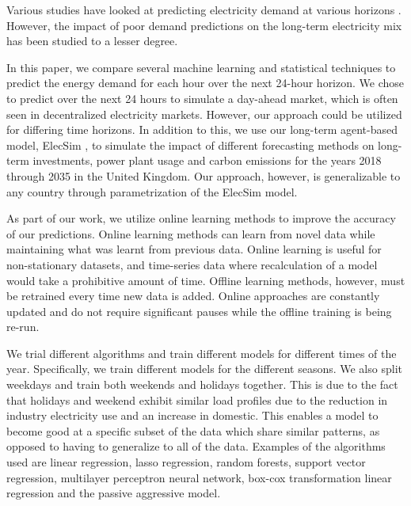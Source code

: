 


Various studies have looked at predicting electricity demand at various horizons \cite{Singh2012,Huang2003,Andersen2013}. However, the impact of poor demand predictions on the long-term electricity mix has been studied to a lesser degree.

In this paper, we compare several machine learning and statistical techniques to predict the energy demand for each hour over the next 24-hour horizon. We chose to predict over the next 24 hours to simulate a day-ahead market, which is often seen in decentralized electricity markets. However, our approach could be utilized for differing time horizons. In addition to this, we use our long-term agent-based model, ElecSim \cite{Kell, Kell2020}, to simulate the impact of different forecasting methods on long-term investments, power plant usage and carbon emissions for the years 2018 through 2035 in the United Kingdom. Our approach, however, is generalizable to any country through parametrization of the ElecSim model.




As part of our work, we utilize online learning methods to improve the accuracy of our predictions. Online learning methods can learn from novel data while maintaining what was learnt from previous data. Online learning is useful for non-stationary datasets, and time-series data where recalculation of a model would take a prohibitive amount of time. Offline learning methods, however, must be retrained every time new data is added. Online approaches are constantly updated and do not require significant pauses while the offline training is being re-run. %

We trial different algorithms and train different models for different times of the year. Specifically, we train different models for the different seasons. We also split weekdays and train both weekends and holidays together. This is due to the fact that holidays and weekend exhibit similar load profiles due to the reduction in industry electricity use and an increase in domestic. This enables a model to become good at a specific subset of the data which share similar patterns, as opposed to having to generalize to all of the data. Examples of the algorithms used are linear regression, lasso regression, random forests, support vector regression, multilayer perceptron neural network, box-cox transformation linear regression and the passive aggressive model. 

